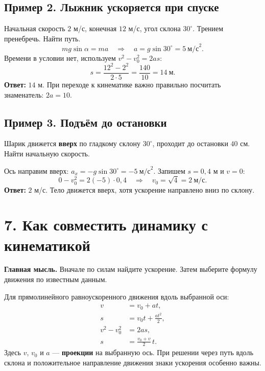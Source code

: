 \documentclass[a4paper,12pt]{article}
\newcommand{\sectionline}[1]{\section*{\textcolor{darkaccent}{#1}}}
\newcommand{\subhead}[1]{\subsection*{\textcolor{darkaccent}{#1}}}
\newcommand{\note}[1]{\textcolor{darkaccent}{\textbf{Главная мысль.}} #1}
\newcommand{\answer}[1]{\textcolor{darkaccent}{\textbf{Ответ:}} #1}
\begin{document}
\subhead{Пример 2. Лыжник ускоряется при спуске}
Начальная скорость $2$ м/с, конечная $12$ м/с, угол склона $30^\circ$. Трением пренебречь. Найти путь.
\[
mg\sin\alpha=ma \quad\Longrightarrow\quad a=g\sin30^\circ=5\ \text{м/с}^2.
\]
Времени в условии нет, используем $v^2-v_0^2=2as$:
\[
s=\frac{12^2-2^2}{2\cdot5}=\frac{140}{10}=14\ \text{м}.
\]
\answer{$14$ м.} При переходе к кинематике важно правильно посчитать знаменатель: $2a=10$.

\subhead{Пример 3. Подъём до остановки}
Шарик движется \textbf{вверх} по гладкому склону $30^\circ$, проходит до остановки $40$ см. Найти начальную скорость.

Ось направим вверх: $a_x=-g\sin30^\circ=-5\ \text{м/с}^2$. Запишем $s=0{,}4$ м и $v=0$:
\[
0-v_0^2=2(-5)\cdot0{,}4
\quad\Longrightarrow\quad v_0=\sqrt4=2\ \text{м/с}.
\]
\answer{$2$ м/с.} Тело движется вверх, хотя ускорение направлено вниз по склону.

\clearpage
\sectionline{7. Как совместить динамику с кинематикой}
\note{Вначале по силам найдите ускорение. Затем выберите формулу движения по известным данным.}

Для прямолинейного равноускоренного движения вдоль выбранной оси:
\begin{align*}
v &= v_0+at,\\
s &= v_0t+\frac{at^2}{2},\\
v^2-v_0^2 &= 2as,\\
s &= \frac{v_0+v}{2}\,t.
\end{align*}
Здесь $v$, $v_0$ и $a$ — \textbf{проекции} на выбранную ось. При решении через путь вдоль склона и положительное направление движения знаки ускорения особенно важны.
\end{document}
